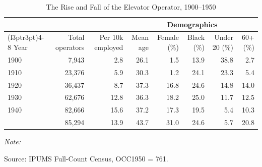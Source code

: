 \begin{table}[!h]
\centering
\caption{The Rise and Fall of the Elevator Operator, 1900--1950}
\centering
\begin{threeparttable}
\begin{tabular}[t]{lrrrrrrr}
\toprule
\multicolumn{3}{c}{ } & \multicolumn{5}{c}{Demographics} \\
\cmidrule(l{3pt}r{3pt}){4-8}
Year & Total operators & Per 10k employed & Mean age & Female (\%) & Black (\%) & Under 20 (\%) & 60+ (\%)\\
\midrule
1900 & 7,943 & 2.8 & 26.1 & 1.5 & 13.9 & 38.8 & 2.7\\
1910 & 23,376 & 5.9 & 30.3 & 1.2 & 24.1 & 23.3 & 5.4\\
1920 & 36,437 & 8.7 & 37.3 & 16.8 & 24.6 & 14.8 & 14.0\\
1930 & 62,676 & 12.8 & 36.3 & 18.2 & 25.0 & 11.7 & 12.5\\
1940 & 82,666 & 15.6 & 37.2 & 17.3 & 19.5 & 5.4 & 10.3\\
\addlinespace
1950 & 85,294 & 13.9 & 43.7 & 31.0 & 24.6 & 5.7 & 20.8\\
\bottomrule
\end{tabular}
\begin{tablenotes}
\item \textit{Note: } 
\item Source: IPUMS Full-Count Census, OCC1950 = 761.
\end{tablenotes}
\end{threeparttable}
\end{table}
